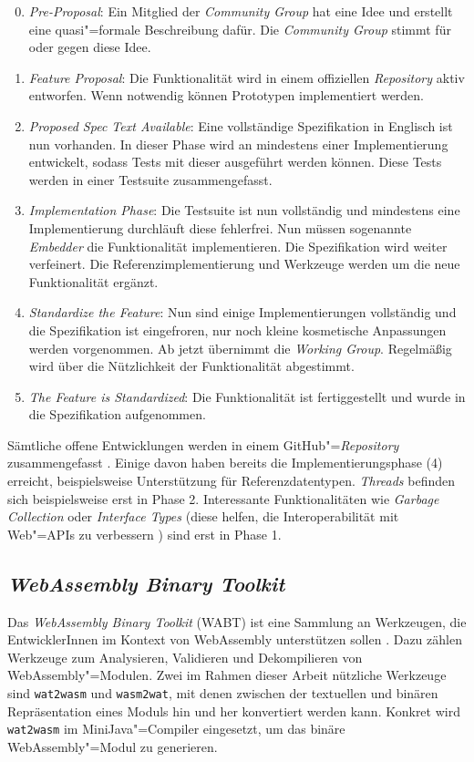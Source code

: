 \begin{enumerate}
    \setcounter{enumi}{-1}
    \item \emph{Pre-Proposal}: Ein Mitglied der \emph{Community Group} hat eine Idee und erstellt eine quasi"=formale Beschreibung dafür. Die \emph{Community Group} stimmt für oder gegen diese Idee.
    \item \emph{Feature Proposal}: Die Funktionalität wird in einem offiziellen \emph{Repository} aktiv entworfen. Wenn notwendig können Prototypen implementiert werden.
    \item \emph{Proposed Spec Text Available}: Eine vollständige Spezifikation in Englisch ist nun vorhanden. In dieser Phase wird an mindestens einer Implementierung entwickelt, sodass Tests mit dieser ausgeführt werden können. Diese Tests werden in einer Testsuite zusammengefasst.
    \item \emph{Implementation Phase}: Die Testsuite ist nun vollständig und mindestens eine Implementierung durchläuft diese fehlerfrei. Nun müssen sogenannte \emph{Embedder} die Funktionalität implementieren. Die Spezifikation wird weiter verfeinert. Die Referenzimplementierung und Werkzeuge werden um die neue Funktionalität ergänzt.
    \item \emph{Standardize the Feature}: Nun sind einige Implementierungen vollständig und die Spezifikation ist eingefroren, nur noch kleine kosmetische Anpassungen werden vorgenommen. Ab jetzt übernimmt die \emph{Working Group}. Regelmäßig wird über die Nützlichkeit der Funktionalität abgestimmt.
    \item \emph{The Feature is Standardized}: Die Funktionalität ist fertiggestellt und wurde in die Spezifikation aufgenommen.
\end{enumerate}

Sämtliche offene Entwicklungen werden in einem GitHub"=\emph{Repository} zusammengefasst \cite{WebAssemblyProposals}.
Einige davon haben bereits die Implementierungsphase (4) erreicht, beispielsweise Unterstützung für Referenzdatentypen. \emph{Threads} befinden sich beispielsweise erst in Phase 2. Interessante Funktionalitäten wie \emph{Garbage Collection} oder \emph{Interface Types} (diese helfen, die Interoperabilität mit Web"=APIs zu verbessern \cite{WebAssemblyInterfaceTypes}) sind erst in Phase 1.

\subsection{\emph{WebAssembly Binary Toolkit}}
Das \emph{WebAssembly Binary Toolkit} (WABT) ist eine Sammlung an Werkzeugen, die EntwicklerInnen im Kontext von WebAssembly unterstützen sollen \cite{WABT}. Dazu zählen Werkzeuge zum Analysieren, Validieren und Dekompilieren von WebAssembly"=Modulen. Zwei im Rahmen dieser Arbeit nützliche Werkzeuge sind \lstinline{wat2wasm} und \lstinline{wasm2wat}, mit denen zwischen der textuellen und binären Repräsentation eines Moduls hin und her konvertiert werden kann. Konkret wird \lstinline{wat2wasm} im MiniJava"=Compiler eingesetzt, um das binäre WebAssembly"=Modul zu generieren.

